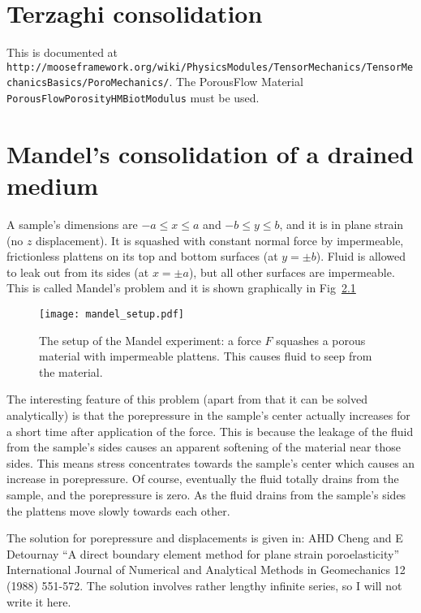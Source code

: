 \documentclass[]{scrreprt}
\begin{document}
\chapter{Terzaghi consolidation}

This is documented at {\tt
  http://mooseframework.org/wiki/PhysicsModules/TensorMechanics/TensorMechanicsBasics/PoroMechanics/}.
The PorousFlow Material {\tt PorousFlowPorosityHMBiotModulus} must be used.

\chapter{Mandel's consolidation of a drained medium}

A sample's dimensions are $-a \leq x \leq a$ and $-b \leq y \leq b$,
and it is in plane strain (no $z$ displacement).  It is squashed with
constant normal force by impermeable, frictionless plattens on its top
and bottom surfaces (at $y = \pm b$).  Fluid is allowed to leak out
from its sides (at $x = \pm a$), but all other surfaces are
impermeable.  This is called Mandel's problem and it is shown
graphically in Fig~\ref{mandel_setup.fig}

\begin{figure}[htb]
\begin{center}
\texttt{[image: mandel\_setup.pdf]}
\caption{The setup of the Mandel experiment: a force $F$ squashes a
  porous material with impermeable plattens.  This causes fluid to
  seep from the material.}
\label{mandel_setup.fig}
\end{center}
\end{figure}

The interesting feature of this problem (apart from that it can be
solved analytically) is that the porepressure in the sample's center
actually increases for a short time after application of the force.
This is because the leakage of the fluid from the sample's sides
causes an apparent softening of the material near those sides.  This
means stress concentrates towards the sample's center which causes an
increase in porepressure.  Of course, eventually the fluid totally
drains from the sample, and the porepressure is zero.  As the fluid
drains from the sample's sides the plattens move slowly towards each
other. 

The solution for porepressure and displacements is given in: AHD Cheng
and E Detournay ``A direct boundary element method for plane strain
poroelasticity'' International Journal of Numerical and Analytical
Methods in Geomechanics 12 (1988) 551-572.  The solution involves
rather lengthy infinite series, so I will not write it here.
\end{document}

